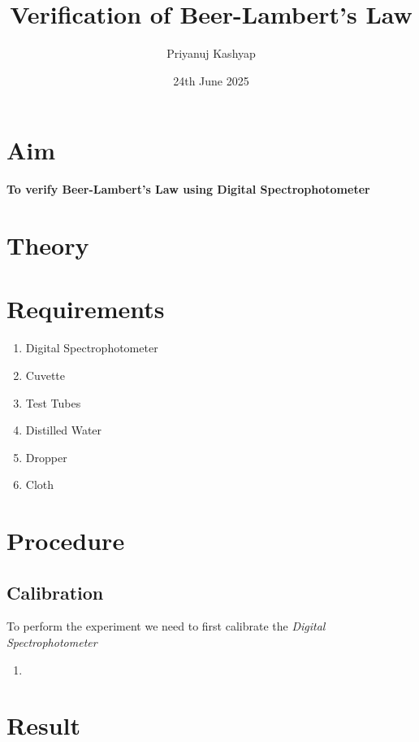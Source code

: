 \documentclass[12pt]{article}
\title{Verification of Beer-Lambert's Law}
\author{Priyanuj Kashyap}
\date{24th June 2025}
\begin{document}
\maketitle

\section{Aim}

\textbf{To verify Beer-Lambert's Law using Digital Spectrophotometer}

\section{Theory}

\section{Requirements}

\begin{multicols}{2}
\begin{enumerate}
    \item Digital Spectrophotometer
    \item Cuvette
    \item Test Tubes
    \item Distilled Water
    \item Dropper
    \item Cloth
\end{enumerate}
\end{multicols}


\section{Procedure}
\subsection{Calibration}
To perform the experiment we need to first calibrate the \emph{Digital Spectrophotometer} 
\begin{enumerate}[Step 1:]
    \item 
\end{enumerate}

\section{Result}
\end{document}
